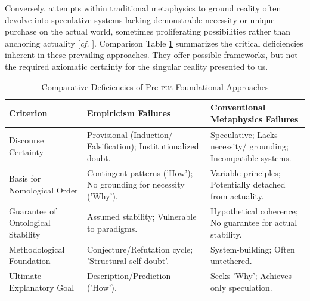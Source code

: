 \documentclass[11pt, a4paper]{article}
\newcommand{\pus}{\textsc{pus}} %
\begin{document}
Conversely, attempts within traditional metaphysics to ground reality often devolve into speculative systems lacking demonstrable necessity or unique purchase on the actual world, sometimes proliferating possibilities rather than anchoring actuality [\textit{cf.} \citealp{lewis1986}]. Comparison Table \ref{tab:framework_failures} summarizes the critical deficiencies inherent in these prevailing approaches.
They offer possible frameworks, but not the required axiomatic certainty for the singular reality presented to us.


\begin{table}[htbp] %
    \centering
    \caption{Comparative Deficiencies of Pre-\pus{} Foundational Approaches}
    \label{tab:framework_failures}
    \begin{tabular}{@{} l p{4.5cm} p{4.5cm} @{}} %
        \toprule %
        \textbf{Criterion} & \textbf{Empiricism Failures} & \textbf{Conventional Metaphysics Failures} \\
        \midrule %
        Discourse Certainty & Provisional (Induction/ Falsification); Institutionalized doubt. & Speculative; Lacks necessity/ grounding; Incompatible systems. \\
        \addlinespace %
        Basis for Nomological Order & Contingent patterns ('How'); No grounding for necessity ('Why'). & Variable principles; Potentially detached from actuality. \\
        \addlinespace
        Guarantee of Ontological Stability & Assumed stability; Vulnerable to paradigms. & Hypothetical coherence; No guarantee for actual stability. \\
        \addlinespace
        Methodological Foundation & Conjecture/Refutation cycle; 'Structural self-doubt'. & System-building; Often untethered. \\
        \addlinespace
        Ultimate Explanatory Goal & Description/Prediction ('How'). & Seeks 'Why'; Achieves only speculation. \\
        \bottomrule %
    \end{tabular}
\end{table}
\end{document}
